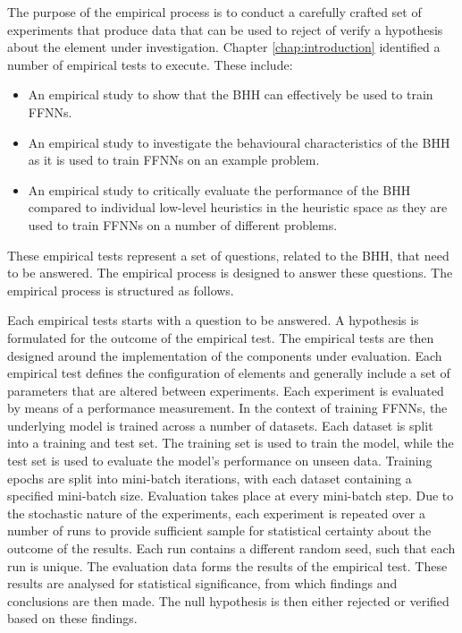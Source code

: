 The purpose of the empirical process is to conduct a carefully crafted set of experiments that produce data that can be used to reject of verify a hypothesis about the element under investigation. Chapter \ref{chap:introduction} identified a number of empirical tests to execute. These include:

\begin{itemize}
      \item An empirical study to show that the \Acs{BHH} can effectively be used to train \acp{FFNN}.

      \item An empirical study to investigate the behavioural characteristics of the \Acs{BHH} as it is used to train \acp{FFNN} on an example problem.

      \item An empirical study to critically evaluate the performance of the \Acs{BHH} compared to individual low-level heuristics in the heuristic space as they are used to train \acp{FFNN} on a number of different problems.
\end{itemize}

\noindent
These empirical tests represent a set of questions, related to the \acs{BHH}, that need to be answered. The empirical process is designed to answer these questions. The empirical process is structured as follows.

Each empirical tests starts with a question to be answered. A hypothesis is formulated for the outcome of the empirical test. The empirical tests are then designed around the implementation of the components under evaluation. Each empirical test defines the configuration of elements and generally include a set of parameters that are altered between experiments. Each experiment is evaluated by means of a performance measurement. In the context of training \acp{FFNN}, the underlying model is trained across a number of datasets. Each dataset is split into a training and test set. The training set is used to train the model, while the test set is used to evaluate the model's performance on unseen data. Training epochs are split into mini-batch iterations, with each dataset containing a specified mini-batch size. Evaluation takes place at every mini-batch step. Due to the stochastic nature of the experiments, each experiment is repeated over a number of runs to provide sufficient sample for statistical certainty about the outcome of the results. Each run contains a different random seed, such that each run is unique. The evaluation data forms the results of the empirical test. These results are analysed for statistical significance, from which findings and conclusions are then made. The null hypothesis is then either rejected or verified based on these findings.

